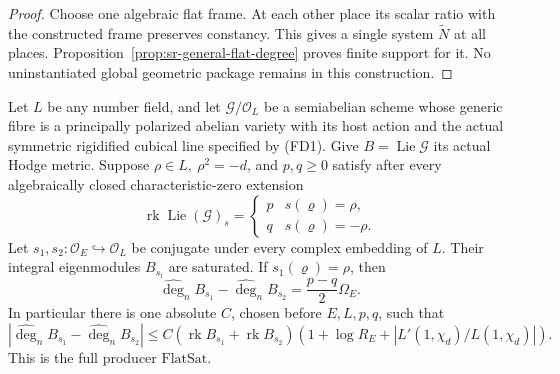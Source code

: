 \begin{proof}
Choose one algebraic flat frame.
At each other place its scalar ratio with the constructed
frame preserves constancy.
This gives a single system \(\widetilde N\) at all places.
Proposition~\ref{prop:sr-general-flat-degree} proves finite
support for it.  No uninstantiated global geometric package
remains in this construction.
\end{proof}

\begin{srtheorem}
\label{thm:sr-general-flat-saturation}
Let \(L\) be any number field, and let
\(\mathcal G/\mathcal O_L\) be a semiabelian scheme
whose generic fibre is a principally polarized abelian
variety with its host action and the actual symmetric
rigidified cubical line specified by (FD1).
Give \(B=\operatorname{Lie}\mathcal G\) its actual Hodge metric.
Suppose \(\rho\in L,\ \rho^2=-d\), and \(p,q\ge0\) satisfy
after every algebraically closed characteristic-zero extension
\[
 \operatorname{rk}\operatorname{Lie}(\mathcal G)_s
       =\begin{cases}p&s(\varrho)=\rho,\\q&s(\varrho)=-\rho.
         \end{cases}
 \tag{FD31}
\]
Let \(s_1,s_2:\mathcal O_E\hookrightarrow\mathcal O_L\) be
conjugate under every complex embedding of \(L\).
Their integral eigenmodules \(B_{s_i}\) are saturated.
If \(s_1(\varrho)=\rho\), then
\[
               \widehat{\deg}_n B_{s_1}
                     -\widehat{\deg}_n B_{s_2}
                                   =\frac{p-q}{2}\Omega_E .
 \tag{FD32}
\]
In particular there is one absolute \(C\), chosen before
\(E,L,p,q\), such that
\[
 \left|\widehat{\deg}_n B_{s_1}-\widehat{\deg}_n B_{s_2}\right|
 \le C(\operatorname{rk}B_{s_1}+\operatorname{rk}B_{s_2})
       \left(1+\log R_E+|L'(1,\chi_d)/L(1,\chi_d)|\right).
 \tag{FD33}
\]
This is the full producer \(\mathrm{FlatSat}\).
\end{srtheorem}
